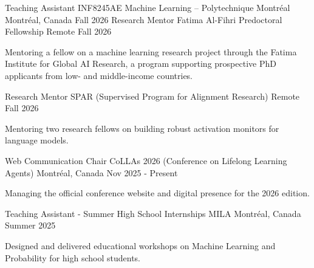 

\begin{cventries}
\cventry
  {Teaching Assistant} %
  {INF8245AE Machine Learning -- Polytechnique Montréal} %
  {Montréal, Canada} %
  {Fall 2026} %
  {}
\cventry
  {Research Mentor} %
  {Fatima Al-Fihri Predoctoral Fellowship} %
  {Remote} %
  {Fall 2026} %
  {
    \begin{cvitems} %
      \item {Mentoring a fellow on a machine learning research project through the Fatima Institute for Global AI Research, a program supporting prospective PhD applicants from low- and middle-income countries.}
    \end{cvitems}
}
\cventry
  {Research Mentor} %
  {SPAR (Supervised Program for Alignment Research)} %
  {Remote} %
  {Fall 2026} %
  {
    \begin{cvitems} %
      \item {Mentoring two research fellows on building robust activation monitors for language models.}
    \end{cvitems}
}
\cventry
  {Web Communication Chair} %
  {CoLLAs 2026 (Conference on Lifelong Learning Agents)} %
  {Montréal, Canada} %
  {Nov 2025 - Present} %
  {
    \begin{cvitems} %
      \item {Managing the official conference website and digital presence for the 2026 edition.}
    \end{cvitems}
}
  \cventry
    {Teaching Assistant - Summer High School Internships} %
    {MILA} %
    {Montréal, Canada} %
    {Summer 2025} %
    {
      \begin{cvitems} %
        \item {Designed and delivered educational workshops on Machine Learning and Probability for high school students.}
      \end{cvitems}
    }


\end{cventries}
